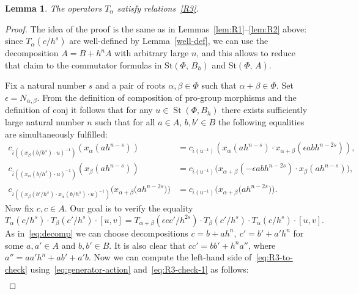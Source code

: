 \documentclass[oneside, 11pt]{amsart}
\numberwithin{equation}{section}
\newtheorem{lemma}{Lemma} \numberwithin{lemma}{section}
\newcommand{\St}{\mathop{\mathrm{St}}\nolimits}
\theoremstyle{definition}
\theoremstyle{definition}
\theoremstyle{remark}
\begin{document}
\begin{lemma} \label{lem:R3-check} The operators $T_\alpha$ satisfy relations~\eqref{R3}. \end{lemma}
\begin{proof}
The idea of the proof is the same as in Lemmas~\ref{lem:R1}--\ref{lem:R2} above: since $T_\alpha(c/h^s)$ are well-defined by Lemma~\ref{well-def}, we can use the decomposition $A=B+h^nA$ with arbitrary large $n$, and this allows to reduce that claim to the commutator formulas in $\mathrm{St}(\Phi,\,B_h)$ and $\mathrm{St}(\Phi,\,A)$.

 Fix a natural number $s$ and a pair of roots $\alpha, \beta \in \Phi$ such that $\alpha+\beta\in\Phi$. Set $\epsilon = N_{\alpha, \beta}$. From the definition of composition of pro-group morphisms and the definition of $\mathrm{conj}$ it follows that for any $u \in \St(\Phi, B_h)$ there exists sufficiently large natural number $n$ such that for all $a \in A$, $b, b'\in B$ the following equalities are simultaneously fulfilled:
 \begin{align}
 c_{ \overline{\iota}((x_\beta(b/h^s) \cdot u)^{-1})}(x_\alpha(ah^{n-s})) &= c_{\overline{\iota}(u^{-1})}\left(x_\alpha(ah^{n-s}) \cdot x_{\alpha+\beta}(\epsilon ab h^{n-2s})\right), \label{eq:R3-check-1}\\
 c_{ \overline{\iota}((x_\alpha(b/h^s) \cdot u)^{-1})}(x_\beta(ah^{n - s})) &= c_{\overline{\iota}(u^{-1})}\bigl(x_{\alpha + \beta}(-\epsilon abh^{n - 2s})\cdot x_\beta(ah^{n - s})\bigr), \label{eq:R3-check-2} \\
 c_{ \overline{\iota}((x_\beta(b'/h^s) \cdot x_\alpha(b/h^s) \cdot u)^{-1})}\bigl(x_{\alpha + \beta}\bigl(a h^{n - 2s}\bigr)\bigr) &= c_{\overline{\iota}(u^{-1})}\bigl(x_{\alpha + \beta}\bigl(a h^{n - 2s}\bigr)\bigr). \label{eq:R3-check-3}
 \end{align} 
Now fix $c, c\in A$. Our goal is to verify the equality 
\begin{equation} \label{eq:R3-to-check} T_\alpha(c/h^s) \cdot T_\beta(c'/h^s) \cdot [u, v] = T_{\alpha+\beta}(\epsilon cc' / h^{2s}) \cdot T_\beta(c'/h^s) \cdot T_\alpha(c/h^s) \cdot [u, v].\end{equation}
As in~\eqref{eq:decomp} we can choose decompositions $c = b + ah^n,\ c' = b' + a'h^n$ for some $a, a' \in A$ and $b, b' \in B$. It is also clear that $cc' = bb' + h^{n}a''$, where $a'' = aa'h^n + ab' + a'b$. Now we can compute the left-hand side of~\eqref{eq:R3-to-check} using~\eqref{eq:generator-action} and~\eqref{eq:R3-check-1} as follows:
\begin{multline*}

\end{multline*}
\end{proof}
\end{document}
